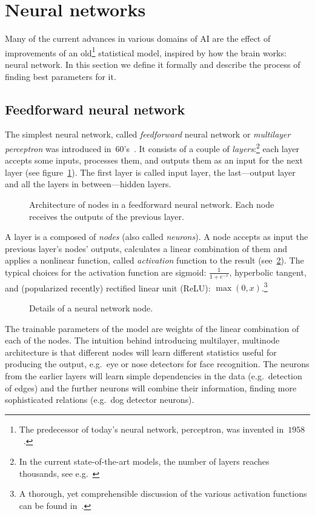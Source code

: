\section{Neural networks}
Many of the current advances in various domains of AI are the effect of improvements of an old\footnote{The predecessor of today's neural network, perceptron, was invented in~$1958$~\cite{perceptron}.} statistical model, inspired by how the brain works: neural network. In this section we define it formally and describe the process of finding best parameters for it.

\subsection{Feedforward neural network}
The simplest neural network, called \emph{feedforward} neural network or \emph{multilayer perceptron} was introduced in~60's~\cite{mlp}.
It consists of a couple of \emph{layers}:\footnote{In the current state-of-the-art models, the number of layers reaches thousands, see e.g.~\cite{stochastic}} each layer accepts some inputs, processes them, and outputs them as an input for the next layer (see figure~\ref{ann-layers}). The first layer is called input layer, the last---output layer and all the layers in between---hidden layers.
\begin{figure}[h]
  \centering
  \resizebox{0.6\textwidth}{!}{
  
  }
  \caption{Architecture of nodes in a feedforward neural network. Each node receives the outputs of the previous layer.}\label{ann-layers} 
\end{figure}

A layer is a composed of \emph{nodes} (also called \emph{neurons}). A node accepts as input the previous layer's nodes' outputs, calculates a linear combination of them and applies a nonlinear function, called \emph{activation} function to the result (see~\ref{ann-nodes}). The typical choices for the activation function are sigmoid: $\frac{1}{1 + e^{-x}}$, hyperbolic tangent, and (popularized recently) rectified linear unit (ReLU): $\max(0, x)$.\footnote{A thorough, yet comprehensible discussion of the various activation functions can be found in~\cite{cs231-actfun}.}
\begin{figure}[h]
  \centering
  \resizebox{0.7\textwidth}{!}{
  
}
  \caption{Details of a neural network node.} \label{ann-nodes}
\end{figure}

The trainable parameters of the model are weights of the linear combination of each of the nodes. The intuition behind introducing multilayer, multinode architecture is that different nodes will learn different statistics useful for producing the output, e.g.~eye or nose detectors for face recognition. The neurons from the earlier layers will learn simple dependencies in the data (e.g.~detection of edges) and the further neurons will combine their information, finding more sophisticated relations (e.g.~dog detector neurons).


